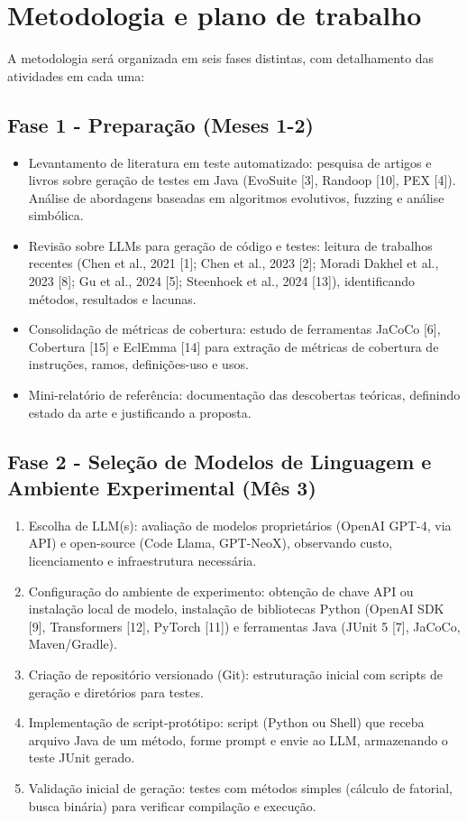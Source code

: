 \section{Metodologia e plano de trabalho}
    A metodologia será organizada em seis fases distintas, com detalhamento das atividades em cada uma:

    \subsection{Fase 1 - Preparação (Meses 1-2)}
        \begin{itemize}
            \item Levantamento de literatura em teste automatizado: pesquisa de artigos e livros sobre geração de testes em Java (EvoSuite [3], Randoop [10], PEX [4]). Análise de abordagens baseadas em algoritmos evolutivos, fuzzing e análise simbólica.
            \item Revisão sobre LLMs para geração de código e testes: leitura de trabalhos recentes (Chen et al., 2021 [1]; Chen et al., 2023 [2]; Moradi Dakhel et al., 2023 [8]; Gu et al., 2024 [5]; Steenhoek et al., 2024 [13]), identificando métodos, resultados e lacunas.
            \item Consolidação de métricas de cobertura: estudo de ferramentas JaCoCo [6], Cobertura [15] e EclEmma [14] para extração de métricas de cobertura de instruções, ramos, definições-uso e usos.
            \item Mini-relatório de referência: documentação das descobertas teóricas, definindo estado da arte e justificando a proposta.
        \end{itemize}
    \subsection{Fase 2 - Seleção de Modelos de Linguagem e Ambiente Experimental (Mês 3)}
        \begin{enumerate}
            \item Escolha de LLM(s): avaliação de modelos proprietários (OpenAI GPT-4, via API) e open-source (Code Llama, GPT-NeoX), observando custo, licenciamento e infraestrutura necessária.
            \item Configuração do ambiente de experimento: obtenção de chave API ou instalação local de modelo, instalação de bibliotecas Python (OpenAI SDK [9], Transformers [12], PyTorch [11]) e ferramentas Java (JUnit 5 [7], JaCoCo, Maven/Gradle).
            \item Criação de repositório versionado (Git): estruturação inicial com scripts de geração e diretórios para testes.
            \item Implementação de script-protótipo: script (Python ou Shell) que receba arquivo Java de um método, forme prompt e envie ao LLM, armazenando o teste JUnit gerado.
            \item Validação inicial de geração: testes com métodos simples (cálculo de fatorial, busca binária) para verificar compilação e execução.
        \end{enumerate}
